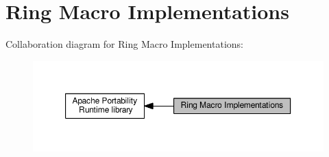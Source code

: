 \hypertarget{group__apr__ring}{}\section{Ring Macro Implementations}
\label{group__apr__ring}
Collaboration diagram for Ring Macro Implementations\+:
\nopagebreak
\begin{figure}[H]
\begin{center}
\leavevmode
\includegraphics[width=350pt]{group__apr__ring}
\end{center}
\end{figure}
